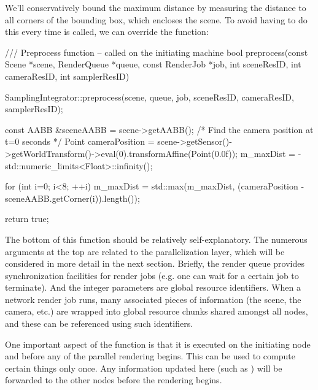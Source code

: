 We'll conservatively bound the maximum distance by measuring the
distance to all corners of the bounding box, which encloses the scene.
To avoid having to do this every time  is called,
we can override the  function:
\begin{cpp}
    /// Preprocess function -- called on the initiating machine
    bool preprocess(const Scene *scene, RenderQueue *queue,
            const RenderJob *job, int sceneResID, int cameraResID,
            int samplerResID) {
        SamplingIntegrator::preprocess(scene, queue, job, sceneResID,
            cameraResID, samplerResID);

        const AABB &sceneAABB = scene->getAABB();
    /* Find the camera position at t=0 seconds */
        Point cameraPosition = scene->getSensor()->getWorldTransform()->eval(0).transformAffine(Point(0.0f));
        m_maxDist = - std::numeric_limits<Float>::infinity();

        for (int i=0; i<8; ++i)
            m_maxDist = std::max(m_maxDist,
                (cameraPosition - sceneAABB.getCorner(i)).length());

        return true;
    }
\end{cpp}
The bottom of this function should be relatively self-explanatory. The
numerous arguments at the top are related to the parallelization layer, which will be
considered in more detail in the next section. Briefly, the render queue
provides synchronization facilities for render jobs (e.g. one can wait
for a certain job to terminate). And the integer parameters are
global resource identifiers. When a network render job runs, many associated
pieces of information (the scene, the camera, etc.) are wrapped into global resource chunks
shared amongst all nodes, and these can be referenced using such identifiers.

One important aspect of the  function is that it is executed
on the initiating node and before any of the parallel rendering begins.
This can be used to compute certain things only once. Any
information updated here (such as ) will be forwarded to the
other nodes before the rendering begins.

